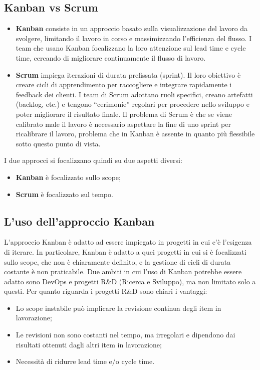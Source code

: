 \subsection{Kanban vs Scrum}
\begin{itemize}
	\item \textbf{Kanban} consiste in un approccio basato sulla visualizzazione del lavoro da svolgere, limitando il lavoro in corso e massimizzando l'efficienza del flusso. I team che usano Kanban focalizzano la loro attenzione sul lead time e cycle time, cercando di migliorare continuamente il flusso di lavoro.
	\item \textbf{Scrum} impiega iterazioni di durata prefissata (sprint). Il loro obiettivo è creare cicli di apprendimento per raccogliere e integrare rapidamente i feedback dei clienti. I team di Scrum adottano ruoli specifici, creano artefatti (backlog, etc.) e tengono “cerimonie” regolari per procedere nello sviluppo e poter migliorare il risultato finale. Il problema di Scrum è che se viene calibrato male il lavoro è necessario aspettare la fine di uno sprint per ricalibrare il lavoro, problema che in Kanban è assente in quanto più flessibile sotto questo punto di vista.
\end{itemize}
\begin{info}
	I due approcci si focalizzano quindi su due aspetti diversi:
	\begin{itemize}
		\item \textbf{Kanban} è focalizzato sullo scope;
		\item \textbf{Scrum} è focalizzato sul tempo.
	\end{itemize}
\end{info}
\subsection{L’uso dell’approccio Kanban}
L’approccio Kanban è adatto ad essere impiegato in progetti in cui c’è l’esigenza di iterare. In particolare, Kanban è adatto a quei progetti in cui si è focalizzati sullo scope, che non è chiaramente definito, e la gestione di cicli di durata costante è non praticabile. Due ambiti in cui l’uso di Kanban potrebbe essere adatto sono DevOps e progetti R\&D (Ricerca e Sviluppo), ma non limitato solo a questi.
Per quanto riguarda i progetti R\&D sono chiari i vantaggi:
\begin{itemize}
	\item Lo scope instabile può implicare la revisione continua degli item in lavorazione;
	\item Le revisioni non sono costanti nel tempo, ma irregolari e dipendono dai risultati ottenuti dagli altri item in lavorazione;
	\item Necessità di ridurre lead time e/o cycle time.
\end{itemize}

